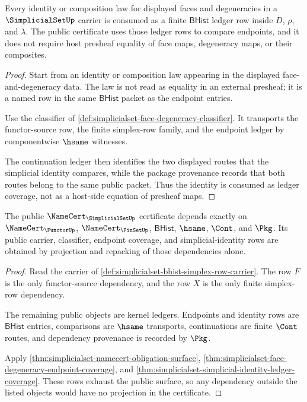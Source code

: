 \begin{theorem}
\label{thm:simplicialset-simplicial-identity-ledger-coverage}
Every identity or composition law for displayed faces and degeneracies in a
$\SimplicialSetUp$ carrier is consumed as a finite $\mathsf{BHist}$ ledger row
inside $D$, $\rho$, and $\lambda$. The public certificate uses those ledger
rows to compare endpoints, and it does not require host presheaf equality of
face maps, degeneracy maps, or their composites.
\end{theorem}
\begin{proof}
Start from an identity or composition law appearing in the displayed
face-and-degeneracy data. The law is not read as equality in an external
presheaf; it is a named row in the same $\mathsf{BHist}$ packet as the
endpoint entries.

Use the classifier of
\autoref{def:simplicialset-face-degeneracy-classifier}. It transports the
functor-source row, the finite simplex-row family, and the endpoint ledger by
componentwise $\hsame$ witnesses.

The continuation ledger then identifies the two displayed routes that the
simplicial identity compares, while the package provenance records that both
routes belong to the same public packet. Thus the identity is consumed as
ledger coverage, not as a host-side equation of presheaf maps.
\end{proof}

\begin{theorem}
\label{thm:simplicialset-public-dependency-scope}
The public $\NameCert_{\SimplicialSetUp}$ certificate depends exactly on
$\NameCert_{\FunctorUp}$, $\NameCert_{\FinSetUp}$, $\mathsf{BHist}$,
$\hsame$, $\Cont$, and $\Pkg$. Its public carrier, classifier, endpoint
coverage, and simplicial-identity rows are obtained by projection and
repacking of those dependencies alone.
\end{theorem}
\begin{proof}
Read the carrier of
\autoref{def:simplicialset-bhist-simplex-row-carrier}. The row $F$ is the
only functor-source dependency, and the row $X$ is the only finite simplex-row
dependency.

The remaining public objects are kernel ledgers. Endpoints and identity rows
are $\mathsf{BHist}$ entries, comparisons are $\hsame$ transports,
continuations are finite $\Cont$ routes, and dependency provenance is recorded
by $\Pkg$.

Apply \autoref{thm:simplicialset-namecert-obligation-surface},
\autoref{thm:simplicialset-face-degeneracy-endpoint-coverage}, and
\autoref{thm:simplicialset-simplicial-identity-ledger-coverage}. These rows
exhaust the public surface, so any dependency outside the listed objects
would have no projection in the certificate.
\end{proof}

